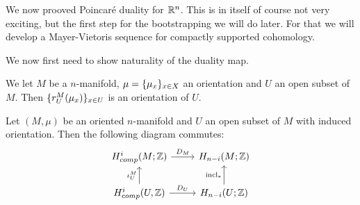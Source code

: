 \documentclass[language=english]{TemplateLecture}
\begin{document}
We now prooved Poincaré duality for \(\mathbb{R}^n\). This is in itself of course not very exciting, but the first step for the bootstrapping we will do later. For that we will develop a Mayer-Vietoris sequence for compactly supported cohomology.

We now first need to show naturality of the duality map.

We let \(M\) be a \(n\)-manifold, \(\mu = \{\mu_x\}_{x \in X}\) an orientation and \(U\) an open subset of \(M\). Then \(\{r_U^M(\mu_x)\}_{x\in U}\) is an orientation of \(U\).

\begin{proposition}
    Let \((M, \mu)\) be an oriented \(n\)-manifold and \(U\) an open subset of \(M\) with induced orientation. Then the following diagram commutes:
    \[\begin{tikzcd}
        H^i_{comp}(M; \IZ) \ar[r, "D_M"] & H_{n-i}(M; \IZ) \\
        H^i_{comp}(U, \IZ) \ar[u, "\iota_U^M"] \ar[r, "D_U"] & H_{n-i}(U; \IZ) \ar[u, "\incl_*" ] \\
    \end{tikzcd}\]
\end{proposition}
\end{document}
